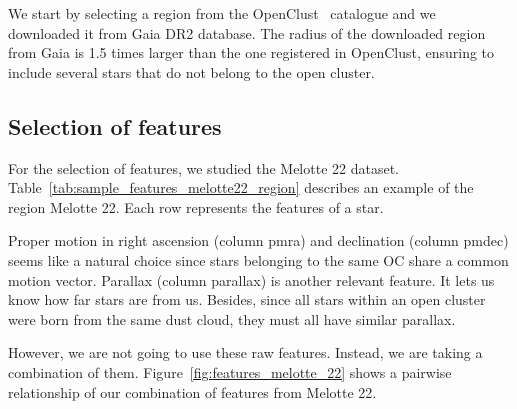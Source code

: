 \documentclass[11pt,a4paper,english,twocolumn]{article}
\begin{document}
We start by selecting a region from the OpenClust~\cite{dias2002new} catalogue and
we downloaded it from Gaia DR2 database. The radius of the downloaded region from Gaia
is 1.5 times larger than the one registered in OpenClust, ensuring to include several
stars that do not belong to the open cluster.

\subsection{Selection of features}
\label{sec:feature_selection}

For the selection of features, we studied the Melotte 22 dataset.
Table~\ref{tab:sample_features_melotte22_region} describes an example of the region Melotte 22.
Each row represents the features of a star.

\begin{table}[!htbp]
  \begin{center}
    \caption{Features of Melotte 22 region.}
    \label{tab:sample_features_melotte22_region}
  \end{center}
\end{table}

Proper motion in right ascension (column pmra) and declination (column pmdec) seems
like a natural choice since stars belonging to the same OC share a common motion vector.
Parallax (column parallax) is another relevant feature. It lets us know how far stars
are from us. Besides, since all stars within an open cluster were born from the same
dust cloud, they must all have similar parallax.

However, we are not going to use these raw features. Instead, we are taking a combination
of them. Figure~\ref{fig:features_melotte_22} shows a pairwise relationship of our
combination of features from Melotte 22.
\end{document}
